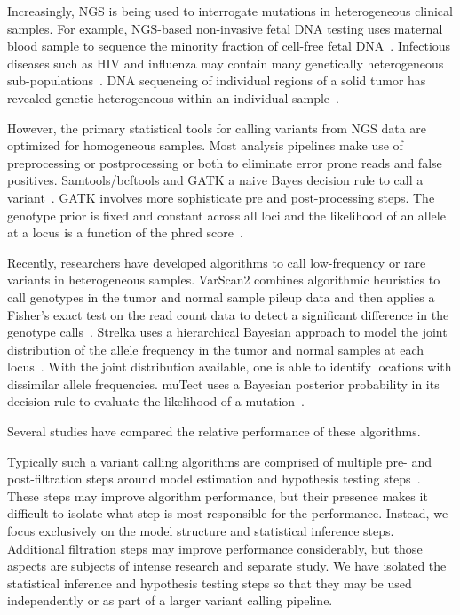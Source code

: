 \documentclass[11pt,reqno]{amsart}
\begin{document}
Increasingly, NGS is being used to interrogate mutations in heterogeneous clinical samples. For example, NGS-based non-invasive fetal DNA testing uses maternal blood sample to sequence the minority fraction of cell-free fetal DNA~\citep{Fan:2008di}. Infectious diseases such as HIV and influenza may contain many genetically heterogeneous sub-populations~\citep{Flaherty:2011ja, Ghedin:2010ie}. DNA sequencing of individual regions of a solid tumor has revealed genetic heterogeneous within an individual sample~\citep{Navin:2010gu}.  

However, the primary statistical tools for calling variants from NGS data are optimized for homogeneous samples. Most analysis pipelines make use of preprocessing or postprocessing or both to eliminate error prone reads and false positives. Samtools/bcftools and GATK a naive Bayes decision rule to call a variant~\citep{}. GATK involves more sophisticate pre and post-processing steps. The genotype prior is fixed and constant across all loci and the likelihood of an allele at a locus is a function of the phred score~\citep{McKenna:2010bv}.

Recently, researchers have developed algorithms to call low-frequency or rare variants in heterogeneous samples.  VarScan2 combines algorithmic heuristics to call genotypes in the tumor and normal sample pileup data and then applies a Fisher's exact test on the read count data to detect a significant difference in the genotype calls~\citep{Koboldt:2012cg}. Strelka uses a hierarchical Bayesian approach to model the joint distribution of the allele frequency in the tumor and normal samples at each locus~\citep{Saunders:2012fh}. With the joint distribution available, one is able to identify locations with dissimilar allele frequencies. muTect uses a Bayesian posterior probability in its decision rule to evaluate the likelihood of a mutation~\citep{Cibulskis:2013ta}.

Several studies have compared the relative performance of these algorithms.

Typically such a variant calling algorithms are comprised of multiple pre- and post-filtration steps around model estimation and hypothesis testing steps~\citep{Pabinger:2013dl}. These steps may improve algorithm performance, but their presence makes it difficult to isolate what step is most responsible for the performance. Instead, we focus exclusively on the model structure and statistical inference steps. Additional filtration steps may improve performance considerably, but those aspects are subjects of intense research and separate study. We have isolated the statistical inference and hypothesis testing steps so that they may be used independently or as part of a larger variant calling pipeline.
\end{document}
